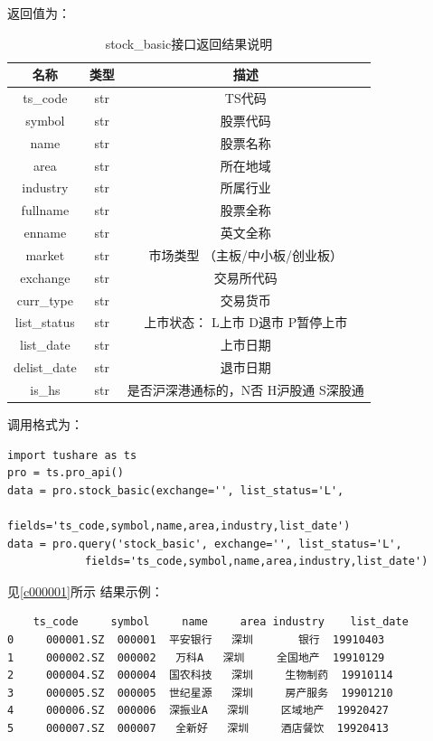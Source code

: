 \documentclass{article}
\begin{document}
返回值为：
\begin{table}[H]
\caption{stock\_basic接口返回结果说明}
\label{t000002}
\begin{tabular}{|c|c|c|} \hline
名称 & 类型 & 描述 \\ \hline  
ts\_code & str & TS代码 \\ \hline
symbol & str & 股票代码 \\ \hline
name & str & 股票名称 \\ \hline
area & str & 所在地域 \\ \hline
industry & str & 所属行业 \\ \hline
fullname & str & 股票全称 \\ \hline
enname & str & 英文全称 \\ \hline
market & str & 市场类型 （主板/中小板/创业板） \\ \hline
exchange & str & 交易所代码 \\ \hline
curr\_type & str & 交易货币 \\ \hline
list\_status & str & 上市状态： L上市 D退市 P暂停上市 \\ \hline
list\_date & str & 上市日期 \\ \hline
delist\_date & str & 退市日期 \\ \hline
is\_hs & str & 是否沪深港通标的，N否 H沪股通 S深股通 \\ \hline
\end{tabular}
\end{table}


调用格式为：
\begin{lstlisting}
import tushare as ts
pro = ts.pro_api()
data = pro.stock_basic(exchange='', list_status='L', 
                    fields='ts_code,symbol,name,area,industry,list_date')
data = pro.query('stock_basic', exchange='', list_status='L', 
			fields='ts_code,symbol,name,area,industry,list_date')
\end{lstlisting}
见\ref{c000001}所示
结果示例：
\begin{lstlisting}
    ts_code     symbol     name     area industry    list_date
0     000001.SZ  000001  平安银行   深圳       银行  19910403
1     000002.SZ  000002   万科A   深圳     全国地产  19910129
2     000004.SZ  000004  国农科技   深圳     生物制药  19910114
3     000005.SZ  000005  世纪星源   深圳     房产服务  19901210
4     000006.SZ  000006  深振业A   深圳     区域地产  19920427
5     000007.SZ  000007   全新好   深圳     酒店餐饮  19920413
\end{lstlisting}
\end{document}
